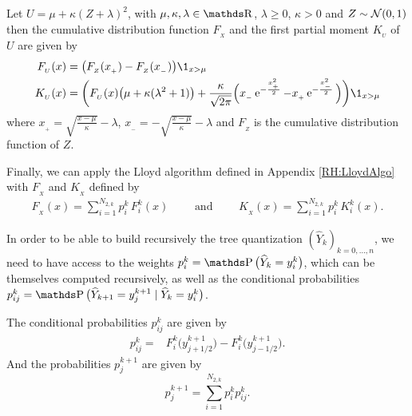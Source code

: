 \begin{lemme}
	Let $U = \mu + \kappa (Z + \lambda)^2$, with $\mu, \kappa, \lambda \in \R$, $\lambda \geq 0$, $\kappa > 0$ and $Z \sim \operatorname{\mathcal{N}} (0, 1)$ then the cumulative distribution function $F_{_X}$ and the first partial moment $K_{_U}$ of $U$ are given by
	\begin{equation}
		\begin{aligned}
			F_{_U} ( x ) & = \big( F_{_Z} ( x_{_+} ) - F_{_Z} ( x_{_-} ) \big) \1_{x > \mu }                                                                                                                                       \\
			K_{_U} ( x ) & = \bigg( F_{_U} ( x ) \big( \mu + \kappa ( \lambda^2 + 1 ) \big) + \frac{ \kappa }{ \sqrt{2 \pi} } \Big( x_{_-} \e^{- \frac{x_{_+}^2}{2}} - x_{_+} \e^{- \frac{x_{_-}^2}{2} } \Big) \bigg) \1_{x > \mu} \\
		\end{aligned}
	\end{equation}
	where $x_{_+} = \sqrt{ \frac{x - \mu}{\kappa} } - \lambda$, $x_{_-} = - \sqrt{ \frac{x - \mu}{\kappa} } - \lambda $ and $F_{_Z}$ is the cumulative distribution function of $Z$.
\end{lemme}


Finally, we can apply the Lloyd algorithm defined in Appendix \ref{RH:LloydAlgo} with $F_{_X}$ and $K_{_X}$ defined by
\begin{equation}
	\begin{aligned}
		F_{_X} ( x ) = \sum_{i=1}^{N_{2,k}} p_i^k \, F_i^k ( x ) \qquad \textrm{ and } \qquad K_{_X} ( x ) = \sum_{i=1}^{N_{2,k}} p_i^k \, K_i^k ( x ).
	\end{aligned}
\end{equation}


In order to be able to build recursively the tree quantization $(\widehat Y_k)_{k = 0, \dots, n}$, we need to have access to the weights $p_i^k = \Prob \big( \widehat Y_k = y_i^k \big)$, which can be themselves computed recursively, as well as the conditional probabilities $p_{ij}^k = \Prob \big( \widehat Y_{k+1} = y_j^{k+1} \mid \widehat Y_k = y_i^k \big)$.

\begin{lemme}
	The conditional probabilities $p_{ij}^k$ are given by
	\begin{equation}\label{RH:condiProbavol}
		\begin{aligned}
			p_{ij}^k
			= & F_i^k \big( y_{j + 1/2}^{k+1} \big) - F_i^k \big( y_{j - 1/2}^{k+1} \big).
		\end{aligned}
	\end{equation}
	And the probabilities $p_j^{k+1}$ are given by
	\begin{equation}
		p_j^{k+1} = \sum_{i=1}^{N_{2,k}} p_i^{k} p_{ij}^k.
	\end{equation}
\end{lemme}

